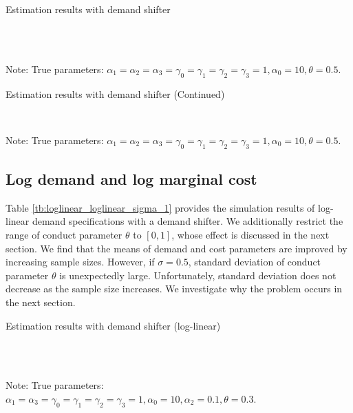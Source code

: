 \documentclass[11pt, a4paper]{article}
\begin{document}
\begin{table}[!htbp]
  \begin{center}
      \caption{Estimation results with demand shifter}
      \label{tb:linear_linear_sigma_1} 
      \subfloat[$\sigma=0.001$]{}\\
      \subfloat[$\sigma=0.5$]{}\\
  \end{center}\footnotesize
  Note: True parameters: $\alpha_1 = \alpha_2 = \alpha_3 = \gamma_0 = \gamma_1 = \gamma_2  = \gamma_3 = 1, \alpha_0 = 10, \theta = 0.5.$
\end{table} 

\begin{table}[!htbp]
  \ContinuedFloat  %
  \begin{center}
      \caption{Estimation results with demand shifter (Continued)}
      \label{tb:linear_linear_sigma_1} 
      \subfloat[$\sigma=1.0$]{}\\
    \subfloat[$\sigma=2.0$]{}
  \end{center}\footnotesize
  Note: True parameters: $\alpha_1 = \alpha_2 = \alpha_3 = \gamma_0 = \gamma_1 = \gamma_2  = \gamma_3 = 1, \alpha_0 = 10, \theta = 0.5.$
\end{table} 


\subsection{Log demand and log marginal cost}
Table \ref{tb:loglinear_loglinear_sigma_1} provides the simulation results of log-linear demand specifications with a demand shifter. 
We additionally restrict the range of conduct parameter $\theta$ to $[0,1]$, whose effect is discussed in the next section. 
We find that the means of demand and cost parameters are improved by increasing sample sizes. 
However, if $\sigma=0.5$, standard deviation of conduct parameter $\theta$ is unexpectedly large. 
Unfortunately, standard deviation does not decrease as the sample size increases. We investigate why the problem occurs in the next section.

\begin{table}[!htbp]
  \begin{center}
      \caption{Estimation results with demand shifter (log-linear)}
      \label{tb:loglinear_loglinear_sigma_1} 
      \subfloat[$\sigma=0.001$]{}\\
      \subfloat[$\sigma=0.5$]{}\\
  \end{center}\footnotesize
  Note: True parameters: $\alpha_1 = \alpha_3 = \gamma_0 = \gamma_1 = \gamma_2  = \gamma_3 = 1, \alpha_0 = 10, \alpha_2 = 0.1,  \theta = 0.3.$
\end{table} 
\end{document}
